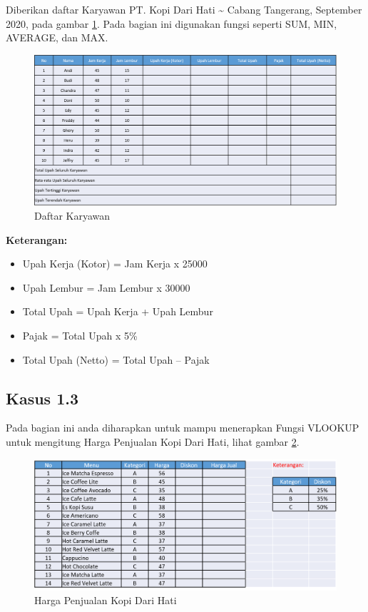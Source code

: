 \documentclass[
]{book}
\providecommand{\tightlist}{%
  \setlength{\itemsep}{0pt}\setlength{\parskip}{0pt}}
\begin{document}
Diberikan daftar Karyawan PT. Kopi Dari Hati \textasciitilde{} Cabang Tangerang, September 2020, pada gambar \ref{fig:tabel2}. Pada bagian ini digunakan fungsi seperti SUM, MIN, AVERAGE, dan MAX.

\begin{figure}

{\centering \includegraphics[width=1\linewidth]{images/tabel2} 

}

\caption{Daftar Karyawan}\label{fig:tabel2}
\end{figure}

\textbf{Keterangan:}

\begin{itemize}
\tightlist
\item
  Upah Kerja (Kotor) = Jam Kerja x 25000
\item
  Upah Lembur = Jam Lembur x 30000
\item
  Total Upah = Upah Kerja + Upah Lembur
\item
  Pajak = Total Upah x 5\%
\item
  Total Upah (Netto) = Total Upah -- Pajak
\end{itemize}

\hypertarget{kasus-1.3}{%
\subsection*{Kasus 1.3}\label{kasus-1.3}}

Pada bagian ini anda diharapkan untuk mampu menerapkan Fungsi VLOOKUP untuk mengitung Harga Penjualan Kopi Dari Hati, lihat gambar \ref{fig:tabel3}.

\begin{figure}

{\centering \includegraphics[width=1\linewidth]{images/tabel3} 

}

\caption{Harga Penjualan Kopi Dari Hati}\label{fig:tabel3}
\end{figure}
\end{document}
